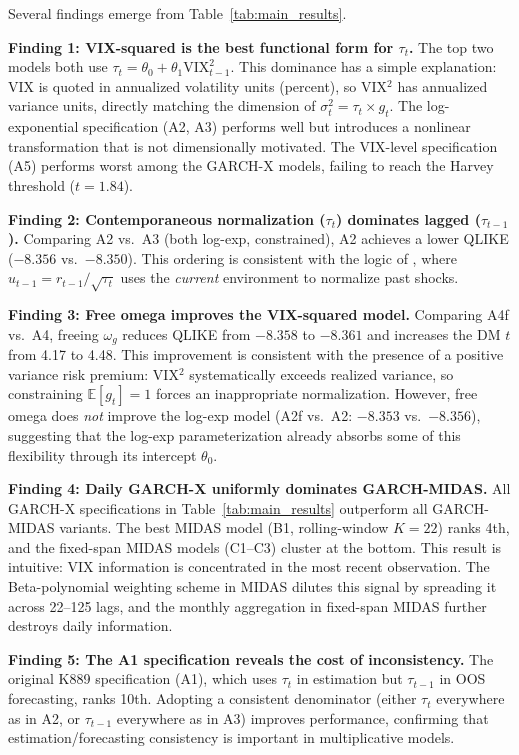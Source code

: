 \documentclass[12pt,a4paper]{article}
\newcommand{\E}{\mathbb{E}}
\begin{document}
Several findings emerge from Table~\ref{tab:main_results}.

\textbf{Finding 1: VIX-squared is the best functional form for $\tau_t$.} The top two models both use $\tau_t = \theta_0 + \theta_1 \mathrm{VIX}_{t-1}^2$. This dominance has a simple explanation: VIX is quoted in annualized volatility units (percent), so VIX$^2$ has annualized variance units, directly matching the dimension of $\sigma_t^2 = \tau_t \times g_t$. The log-exponential specification (A2, A3) performs well but introduces a nonlinear transformation that is not dimensionally motivated. The VIX-level specification (A5) performs worst among the GARCH-X models, failing to reach the Harvey threshold ($t = 1.84$).

\textbf{Finding 2: Contemporaneous normalization ($\tau_t$) dominates lagged ($\tau_{t-1}$).} Comparing A2 vs.\ A3 (both log-exp, constrained), A2 achieves a lower QLIKE ($-8.356$ vs.\ $-8.350$). This ordering is consistent with the logic of \citet[Eq.~4]{engle2013}, where $u_{t-1} = r_{t-1}/\sqrt{\tau_t}$ uses the \emph{current} environment to normalize past shocks.

\textbf{Finding 3: Free omega improves the VIX-squared model.} Comparing A4f vs.\ A4, freeing $\omega_g$ reduces QLIKE from $-8.358$ to $-8.361$ and increases the DM $t$ from 4.17 to 4.48. This improvement is consistent with the presence of a positive variance risk premium: VIX$^2$ systematically exceeds realized variance, so constraining $\E[g_t] = 1$ forces an inappropriate normalization. However, free omega does \emph{not} improve the log-exp model (A2f vs.\ A2: $-8.353$ vs.\ $-8.356$), suggesting that the log-exp parameterization already absorbs some of this flexibility through its intercept $\theta_0$.

\textbf{Finding 4: Daily GARCH-X uniformly dominates GARCH-MIDAS.} All GARCH-X specifications in Table~\ref{tab:main_results} outperform all GARCH-MIDAS variants. The best MIDAS model (B1, rolling-window $K=22$) ranks 4th, and the fixed-span MIDAS models (C1--C3) cluster at the bottom. This result is intuitive: VIX information is concentrated in the most recent observation. The Beta-polynomial weighting scheme in MIDAS dilutes this signal by spreading it across 22--125 lags, and the monthly aggregation in fixed-span MIDAS further destroys daily information.

\textbf{Finding 5: The A1 specification reveals the cost of inconsistency.} The original K889 specification (A1), which uses $\tau_t$ in estimation but $\tau_{t-1}$ in OOS forecasting, ranks 10th. Adopting a consistent denominator (either $\tau_t$ everywhere as in A2, or $\tau_{t-1}$ everywhere as in A3) improves performance, confirming that estimation/forecasting consistency is important in multiplicative models.
\end{document}
